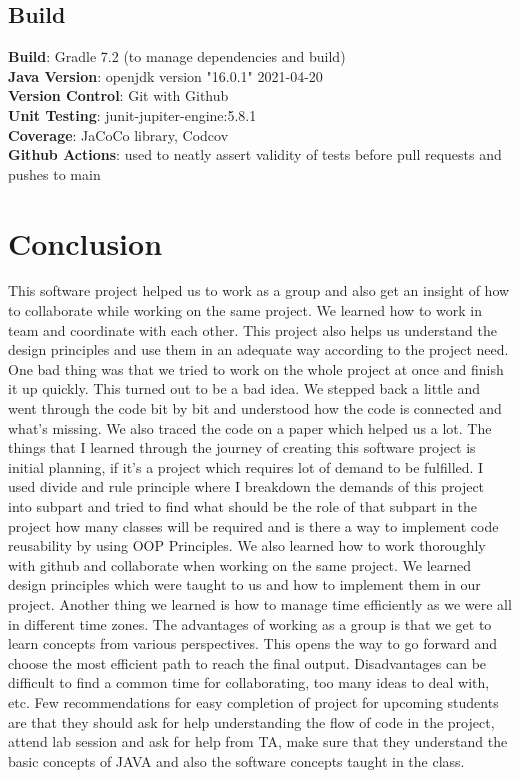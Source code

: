 \documentclass[12pt, dvipsnames, a4paper]{article}
\begin{document}
\subsection{Build}
\textbf{Build}: Gradle 7.2 (to manage dependencies and build)\\
\textbf{Java Version}: openjdk version "16.0.1" 2021-04-20\\
\textbf{Version Control}: Git with Github \\
\textbf{Unit Testing}: junit-jupiter-engine:5.8.1\\
\textbf{Coverage}: JaCoCo library, Codcov\\
\textbf{Github Actions}: used to neatly assert validity of tests before pull requests and pushes to main

\section{Conclusion}
This software project helped us to work as a group and also get an insight of how to collaborate while working on the same project.
We learned how to work in team and coordinate with each other. This project also helps us understand the design principles and use
them in an adequate way according to the project need. One bad thing was that we tried to work on the whole project at once and finish
it up quickly. This turned out to be a bad idea. We stepped back a little and went through the code bit by bit and understood how the
code is connected and what’s missing. We also traced the code on a paper which helped us a lot. The things that I learned through the
journey of creating this software project is initial planning, if it’s a project which requires lot of demand to be fulfilled. I used
divide and rule principle where I breakdown the demands of this project into subpart and tried to find what should be the role of that
subpart in the project how many classes will be required and is there a way to implement code reusability by using OOP Principles. We also
learned how to work thoroughly with github and collaborate when working on the same project. We learned design principles which were taught
to us and how to implement them in our project. Another thing we learned is how to manage time efficiently as we were all in different time zones.
The advantages of working as a group is that we get to learn concepts from various perspectives. This opens the way to go forward and choose the
most efficient path to reach the final output. Disadvantages can be difficult to find a common time for collaborating, too many ideas to deal with, etc.
Few recommendations for easy completion of project for upcoming students are that they should ask for help understanding the flow of code
in the project, attend lab session and ask for help from TA, make sure that they understand the basic concepts of JAVA and also the software
concepts taught in the class.
\end{document}
